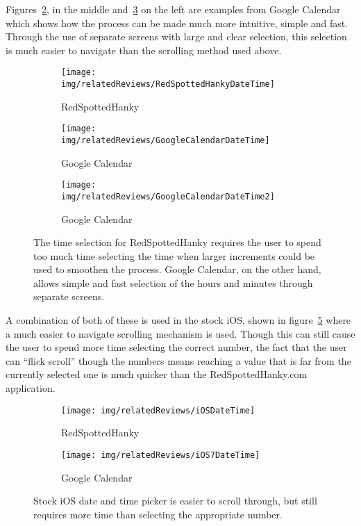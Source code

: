 Figures~\ref{fig:GoogleCalendarDateTime}, in the middle
and~\ref{fig:GoogleCalendarDateTime2} on the left are examples from Google
Calendar which shows how the process can be made much more intuitive, simple
and fast. Through the use of separate screens with large and clear selection,
this selection is much easier to navigate than the scrolling method used above.
\begin{figure}[htbp]
	\centering
	\begin{subfigure}[b]{0.28\textwidth}
		\texttt{[image: img/relatedReviews/RedSpottedHankyDateTime]}
		\caption{RedSpottedHanky}\label{fig:RedSpottedHankyDateTime}
	\end{subfigure}%
	\qquad
	\begin{subfigure}[b]{0.29\textwidth}
		\texttt{[image: img/relatedReviews/GoogleCalendarDateTime]}
		\caption{Google Calendar}\label{fig:GoogleCalendarDateTime}
	\end{subfigure}
	\qquad
	\begin{subfigure}[b]{0.29\textwidth}
		\texttt{[image: img/relatedReviews/GoogleCalendarDateTime2]}
		\caption{Google Calendar}\label{fig:GoogleCalendarDateTime2}
	\end{subfigure}
	\caption{The time selection for RedSpottedHanky requires the user to
		spend too much time selecting the time when larger increments could be
		used to smoothen the process. Google Calendar, on the other hand,
		allows simple and fast selection of the hours and minutes through
	separate screens. }\label{fig:date_time_selection}
\end{figure}

A combination of both of these is used in the stock iOS, shown in
figure~\ref{fig:iOSDateTime}\cite{iOSDateTime} where a much easier to navigate
scrolling mechanism is used. Though this can still cause the user to spend more
time selecting the correct number, the fact that the user can ``flick scroll''
though the numbers means reaching a value that is far from the currently
selected one is much quicker than the RedSpottedHanky.com application.
\begin{figure}[htbp]
	\centering
	\begin{subfigure}[b]{0.3\textwidth}
		\texttt{[image: img/relatedReviews/iOSDateTime]}
		\caption{RedSpottedHanky}
	\end{subfigure}%
	\qquad
	\begin{subfigure}[b]{0.4\textwidth}
		\texttt{[image: img/relatedReviews/iOS7DateTime]}
		\caption{Google Calendar}
	\end{subfigure}
	\caption{Stock iOS date and time picker is easier to scroll through, but
		still requires more time than selecting the appropriate number.
	}\label{fig:iOSDateTime}
\end{figure}

